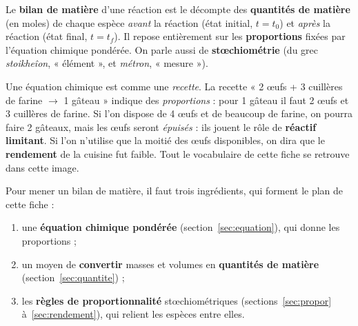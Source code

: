 \documentclass[11pt,a4paper]{article}
\begin{document}
\begin{definition}
Le \textbf{bilan de matière} d'une réaction est le décompte des \textbf{quantités de matière}
(en moles) de chaque espèce \emph{avant} la réaction (état initial, $t=t_0$) et \emph{après} la
réaction (état final, $t=t_f$). Il repose entièrement sur les \textbf{proportions} fixées par
l'équation chimique pondérée. On parle aussi de \textbf{stœchiométrie} (du grec \emph{stoikheîon},
« élément », et \emph{métron}, « mesure »).
\end{definition}

\begin{remarque}
Une équation chimique est comme une \emph{recette}. La recette « 2 œufs + 3 cuillères de farine
$\rightarrow$ 1 gâteau »
indique des \emph{proportions} : pour 1 gâteau il faut 2 œufs et 3 cuillères de farine. Si l'on
dispose de 4 œufs et de beaucoup de farine, on pourra faire 2 gâteaux, mais les œufs seront
\emph{épuisés} : ils jouent le rôle de \textbf{réactif limitant}. Si l'on n'utilise que la moitié
des œufs disponibles, on dira que le \textbf{rendement} de la cuisine fut faible. Tout le
vocabulaire de cette fiche se retrouve dans cette image.
\end{remarque}

Pour mener un bilan de matière, il faut trois ingrédients, qui forment le plan de cette fiche :
\begin{enumerate}[leftmargin=1.7em,topsep=2pt,itemsep=2pt]
  \item une \textbf{équation chimique pondérée} (section~\ref{sec:equation}), qui donne les proportions ;
  \item un moyen de \textbf{convertir} masses et volumes en \textbf{quantités de matière} (section~\ref{sec:quantite}) ;
  \item les \textbf{règles de proportionnalité} stœchiométriques (sections~\ref{sec:propor} à~\ref{sec:rendement}),
        qui relient les espèces entre elles.
\end{enumerate}
\end{document}
